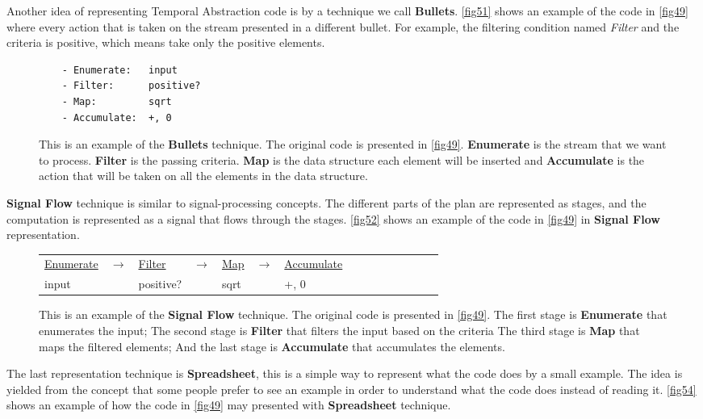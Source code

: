 Another idea of representing Temporal Abstraction code is by a technique we call \textbf{Bullets}. \autoref{fig51} shows an example of the code in \autoref{fig49} where every action that is taken on the stream presented in a different bullet. For example, the filtering condition named \textit{Filter} and the criteria is positive, which means take only the positive elements.
\begin{figure}[H]
\begin{lstlisting}
	- Enumerate:   input
	- Filter:      positive?
	- Map:         sqrt
	- Accumulate:  +, 0
\end{lstlisting}
\caption{This is an example of the \textbf{Bullets} technique. The original code is presented in \autoref{fig49}. \textbf{Enumerate} is the stream that we want to process. \textbf{Filter} is the passing criteria. \textbf{Map} is the data structure each element will be inserted and \textbf{Accumulate} is the action that will be taken on all the elements in the data structure.}
\label{fig51}
\end{figure}
\textbf{Signal Flow} technique is similar to signal-processing concepts. The different parts of the plan are represented as stages, and the computation is represented as a signal that flows through the stages. \autoref{fig52} shows an example of the code in \autoref{fig49} in \textbf{Signal Flow} representation.
\begin{figure}[H]
\begin{table}[H]
\centering
\begin{tabular}{l p{2cm}l p{0.3cm}l p{1.5cm}l p{0.3cm}l p{1cm}l p{0.3cm}l p{1cm} l}
\underline{Enumerate} & $ \rightarrow $ & \underline{Filter} & $ \rightarrow $ & \underline{Map}  & $ \rightarrow $ & \underline{Accumulate} \\
input & & positive? & & sqrt & & +, 0
\end{tabular}
\end{table}
\caption{This is an example of the \textbf{Signal Flow} technique. The original code is presented in \autoref{fig49}. The first stage is \textbf{Enumerate} that enumerates the input; The second stage is \textbf{Filter} that filters the input based on the criteria\; The third stage is \textbf{Map} that maps the filtered elements; And the last stage is \textbf{Accumulate} that accumulates the elements.}
\label{fig52}
\end{figure}
The last representation technique is \textbf{Spreadsheet}, this is a simple way to represent what the code does by a small example. The idea is yielded from the concept that some people prefer to see an example in order to understand what the code does instead of reading it. \autoref{fig54} shows an example of how the code in \autoref{fig49} may presented with \textbf{Spreadsheet} technique.
